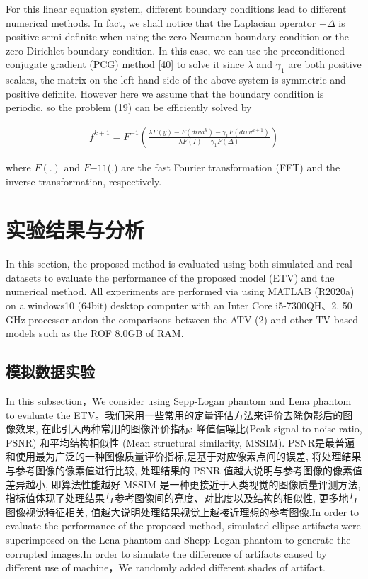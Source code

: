 \documentclass[hyperref]{ctexart}
\begin{document}
{\begin{multicols}{2}
		
		For this linear equation system, different boundary conditions lead to different numerical methods. In fact, we shall notice that the Laplacian operator $-\Delta$ is positive semi-definite when using the zero Neumann boundary condition or the zero Dirichlet boundary condition. In this case, we can use the preconditioned conjugate gradient (PCG) method [40] to solve it since $\lambda$ and $\gamma_1$ are both positive scalars, the matrix on the left-hand-side of the above system is symmetric and positive definite. However here we assume that the boundary condition is periodic, so the problem (19) can be efficiently solved by
		
		\begin{equation}
			\begin{split}
				f^{k+1}  = F^{-1}\left(  \frac{	 \lambda F(y) - F(div a^{k}) - \gamma_1 F(div v^{k+1})}{\lambda F(I) - \gamma_1 F(\Delta)} \right) 
			\end{split}
		\end{equation}
		
		where $F(.)$ and $F{-1}1$(.) are the fast Fourier transformation (FFT) and the inverse transformation, respectively.
		
		\section{实验结果与分析}
		In this section, the proposed method is evaluated using both simulated and real datasets to evaluate the performance of the proposed model (ETV) and the numerical method. All experiments are performed via using MATLAB (R2020a) on a windows10 (64bit) desktop computer with an Inter Core i5-7300QH、2. 50 GHz processor andon the comparisons between the ATV (2) and other TV-based models such as the ROF 8.0GB of RAM. 
		
		\subsection{模拟数据实验}
		In this subsection，We consider using Sepp-Logan phantom and Lena phantom to evaluate the ETV。我们采用一些常用的定量评估方法来评价去除伪影后的图像效果, 在此引入两种常用的图像评价指标: 峰值信噪比(Peak signal-to-noise ratio, PSNR) 和平均结构相似性 (Mean structural similarity, MSSIM). PSNR是最普遍和使用最为广泛的一种图像质量评价指标,是基于对应像素点间的误差, 将处理结果与参考图像的像素值进行比较, 处理结果的 PSNR 值越大说明与参考图像的像素值差异越小, 即算法性能越好.MSSIM 是一种更接近于人类视觉的图像质量评测方法, 指标值体现了处理结果与参考图像间的亮度、对比度以及结构的相似性, 更多地与图像视觉特征相关, 值越大说明处理结果视觉上越接近理想的参考图像.In order to evaluate the performance of the proposed method, simulated-ellipse artifacts were superimposed on the Lena phantom and Shepp-Logan phantom to generate the corrupted images.In order to simulate the difference of artifacts caused by different use of machine，We randomly added different shades of artifact.
		

\end{multicols}}
\end{document}
